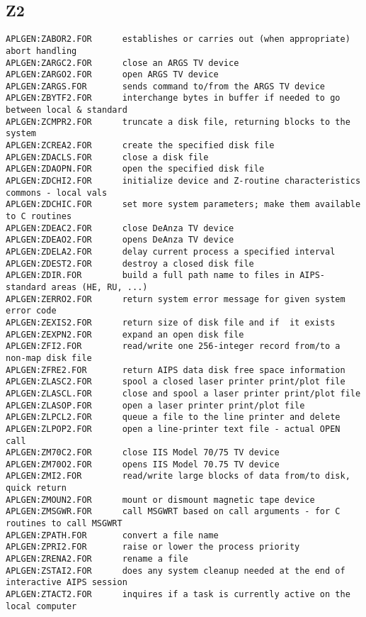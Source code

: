 \subsection{Z2}
\begin{verbatim}
APLGEN:ZABOR2.FOR      establishes or carries out (when appropriate) abort handling
APLGEN:ZARGC2.FOR      close an ARGS TV device
APLGEN:ZARGO2.FOR      open ARGS TV device
APLGEN:ZARGS.FOR       sends command to/from the ARGS TV device
APLGEN:ZBYTF2.FOR      interchange bytes in buffer if needed to go between local & standard
APLGEN:ZCMPR2.FOR      truncate a disk file, returning blocks to the system
APLGEN:ZCREA2.FOR      create the specified disk file
APLGEN:ZDACLS.FOR      close a disk file
APLGEN:ZDAOPN.FOR      open the specified disk file
APLGEN:ZDCHI2.FOR      initialize device and Z-routine characteristics commons - local vals
APLGEN:ZDCHIC.FOR      set more system parameters; make them available to C routines
APLGEN:ZDEAC2.FOR      close DeAnza TV device
APLGEN:ZDEAO2.FOR      opens DeAnza TV device
APLGEN:ZDELA2.FOR      delay current process a specified interval
APLGEN:ZDEST2.FOR      destroy a closed disk file
APLGEN:ZDIR.FOR        build a full path name to files in AIPS-standard areas (HE, RU, ...)
APLGEN:ZERRO2.FOR      return system error message for given system error code
APLGEN:ZEXIS2.FOR      return size of disk file and if  it exists
APLGEN:ZEXPN2.FOR      expand an open disk file
APLGEN:ZFI2.FOR        read/write one 256-integer record from/to a non-map disk file
APLGEN:ZFRE2.FOR       return AIPS data disk free space information
APLGEN:ZLASC2.FOR      spool a closed laser printer print/plot file
APLGEN:ZLASCL.FOR      close and spool a laser printer print/plot file
APLGEN:ZLASOP.FOR      open a laser printer print/plot file
APLGEN:ZLPCL2.FOR      queue a file to the line printer and delete
APLGEN:ZLPOP2.FOR      open a line-printer text file - actual OPEN call
APLGEN:ZM70C2.FOR      close IIS Model 70/75 TV device
APLGEN:ZM70O2.FOR      opens IIS Model 70.75 TV device
APLGEN:ZMI2.FOR        read/write large blocks of data from/to disk, quick return
APLGEN:ZMOUN2.FOR      mount or dismount magnetic tape device
APLGEN:ZMSGWR.FOR      call MSGWRT based on call arguments - for C routines to call MSGWRT
APLGEN:ZPATH.FOR       convert a file name
APLGEN:ZPRI2.FOR       raise or lower the process priority
APLGEN:ZRENA2.FOR      rename a file
APLGEN:ZSTAI2.FOR      does any system cleanup needed at the end of interactive AIPS session
APLGEN:ZTACT2.FOR      inquires if a task is currently active on the local computer

\end{verbatim}
